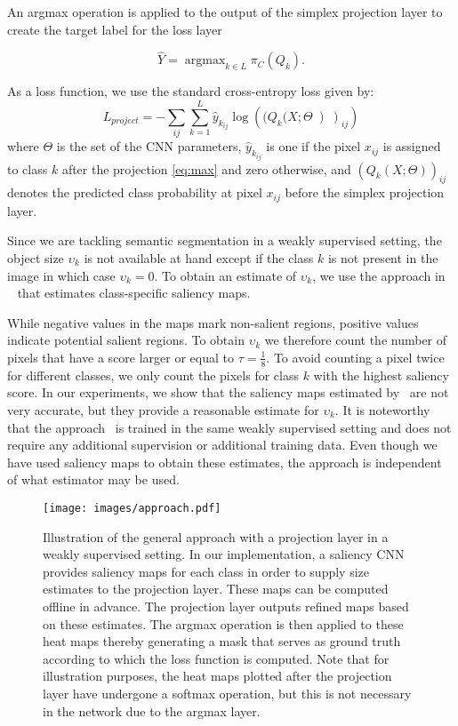 \documentclass{bmvc2k}
\DeclareMathOperator*{\argmax}{\mathrm{argmax}}
\begin{document}
	An argmax operation is applied to the output of the simplex projection layer to create the target label for the loss layer

	\begin{equation}\label{eq:max}
	\hat{Y} = \argmax_{k\in L}\pi_C(Q_k).
	\end{equation}

	As a loss function, we use the standard cross-entropy loss given by:
	\begin{equation}
	L_{project}=-\sum_{ij}\sum_{k=1}^{L}\hat{y}_{k_{ij}} \log \left((Q_k(X;\Theta\left)\right)_{ij} \right ) 
	\label{eq:entropyloss}
	\end{equation}
	where $\Theta$ is the set of the CNN parameters, $\hat{y}_{k_{ij}}$ is one if the pixel $x_{ij}$ is assigned to class $k$ after the projection \eqref{eq:max} and zero otherwise, and $\left(Q_k(X;\Theta)\right)_{ij}$ denotes the predicted class probability at pixel $x_{ij}$ before the simplex projection layer. 

	 Since we are tackling semantic segmentation in a weakly supervised setting, the object size $\upsilon_k$ is not available at hand except if the class $k$ is not present in the image in which case $\upsilon_k=0$. To obtain an estimate of $\upsilon_k$, we use the approach in ~\cite{Shimoda2016DistinctCS} that estimates class-specific saliency maps.
	 
While negative values in the maps mark non-salient regions, positive values indicate potential salient regions. To obtain $\upsilon_k$ we therefore count the number of pixels that have a score larger or equal to $\tau=\frac{1}{8}$. To avoid counting a pixel twice for different classes, we only count the pixels for class $k$ with the highest saliency score.    
In our experiments, we show that the saliency maps estimated by~\cite{Shimoda2016DistinctCS} are not very accurate, but they provide a reasonable estimate for $\upsilon_k$. It is noteworthy that the approach~\cite{Shimoda2016DistinctCS} is trained in the same weakly supervised setting and does not require any additional supervision or additional training data. Even though we have used saliency maps to obtain these estimates, the approach is independent of what estimator may be used.                  

	
	\begin{figure}[t]
		\centering
		\texttt{[image: images/approach.pdf]}
		\caption{Illustration of the general approach with a projection layer in a weakly supervised setting. In our implementation, a saliency CNN provides saliency maps for each class in order to supply size estimates to the projection layer. These maps can be computed offline in advance. The projection layer outputs refined maps based on these estimates. The argmax operation is then applied to these heat maps thereby generating a mask that serves as ground truth according to which the loss function is computed. Note that for illustration purposes, the heat maps plotted after the projection layer have undergone a softmax operation, but this is not necessary in the network due to the argmax layer.
			}
		\label{fig:approach}
	\end{figure} 
\end{document}

